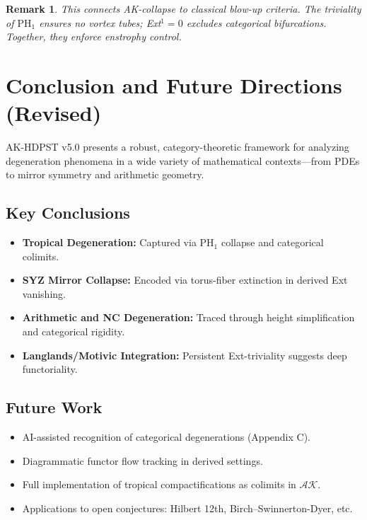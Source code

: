 \documentclass[11pt]{article}
\newtheorem{remark}[theorem]{Remark}
\begin{document}
\begin{remark}
This connects AK-collapse to classical blow-up criteria. The triviality of $\mathrm{PH}_1$ ensures no vortex tubes; Ext$^1 = 0$ excludes categorical bifurcations. Together, they enforce enstrophy control.
\end{remark}



\section{Conclusion and Future Directions (Revised)}

AK-HDPST v5.0 presents a robust, category-theoretic framework for analyzing degeneration phenomena in a wide variety of mathematical contexts—from PDEs to mirror symmetry and arithmetic geometry.

\subsection*{Key Conclusions}
\begin{itemize}
    \item \textbf{Tropical Degeneration:} Captured via PH\(_1\) collapse and categorical colimits.
    \item \textbf{SYZ Mirror Collapse:} Encoded via torus-fiber extinction in derived Ext vanishing.
    \item \textbf{Arithmetic and NC Degeneration:} Traced through height simplification and categorical rigidity.
    \item \textbf{Langlands/Motivic Integration:} Persistent Ext-triviality suggests deep functoriality.
\end{itemize}

\subsection*{Future Work}
\begin{itemize}
    \item AI-assisted recognition of categorical degenerations (Appendix C).
    \item Diagrammatic functor flow tracking in derived settings.
    \item Full implementation of tropical compactifications as colimits in \( \mathcal{AK} \).
    \item Applications to open conjectures: Hilbert 12th, Birch–Swinnerton-Dyer, etc.
\end{itemize}
\end{document}

